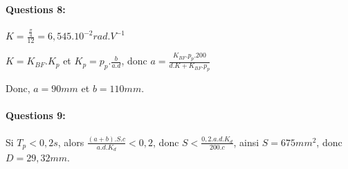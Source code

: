 \paragraph{Questions 8:}

$K=\frac{\frac{\pi}{4}}{12}=6,545.10^{-2}rad.V^{-1}$

$K=K_{BF}.K_p$ et $K_p=p_p.\frac{b}{a.d}$, donc  $a=\frac{K_{BF}.p_p.200}{d.K+K_{BF}.p_p}$

Donc, $a=90mm$ et $b=110mm$.

\paragraph{Questions 9:}

Si $T_p<0,2s$, alors $\frac{(a+b).S.c}{a.d.K_d}<0,2$, donc $S<\frac{0,2.a.d.K_d}{200.c}$, ainsi $S=675mm^2$, donc $D=29,32mm$.


